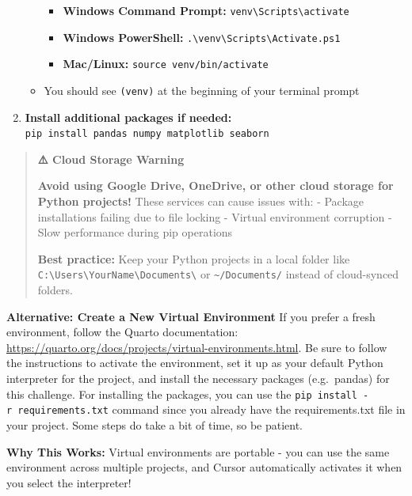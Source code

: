 \documentclass[
  letterpaper,
  DIV=11,
  numbers=noendperiod]{scrartcl}
\providecommand{\tightlist}{%
  \setlength{\itemsep}{0pt}\setlength{\parskip}{0pt}}
\begin{document}
\begin{tcolorbox}
\begin{enumerate}
\begin{itemize}
    \begin{itemize}
    \tightlist
    \item
      \textbf{Windows Command Prompt:}
      \texttt{venv\textbackslash{}Scripts\textbackslash{}activate}
    \item
      \textbf{Windows PowerShell:}
      \texttt{.\textbackslash{}venv\textbackslash{}Scripts\textbackslash{}Activate.ps1}
    \item
      \textbf{Mac/Linux:} \texttt{source\ venv/bin/activate}
    \end{itemize}
  \item
    You should see \texttt{(venv)} at the beginning of your terminal
    prompt
  \end{itemize}
\item
  \textbf{Install additional packages if needed:}
  \texttt{pip\ install\ pandas\ numpy\ matplotlib\ seaborn}
\end{enumerate}

\begin{quote}
\textbf{⚠️ Cloud Storage Warning}

\textbf{Avoid using Google Drive, OneDrive, or other cloud storage for
Python projects!} These services can cause issues with: - Package
installations failing due to file locking - Virtual environment
corruption - Slow performance during pip operations

\textbf{Best practice:} Keep your Python projects in a local folder like
\texttt{C:\textbackslash{}Users\textbackslash{}YourName\textbackslash{}Documents\textbackslash{}}
or \texttt{\textasciitilde{}/Documents/} instead of cloud-synced
folders.
\end{quote}

\textbf{Alternative: Create a New Virtual Environment} If you prefer a
fresh environment, follow the Quarto documentation:
\url{https://quarto.org/docs/projects/virtual-environments.html}. Be
sure to follow the instructions to activate the environment, set it up
as your default Python interpreter for the project, and install the
necessary packages (e.g.~pandas) for this challenge. For installing the
packages, you can use the \texttt{pip\ install\ -r\ requirements.txt}
command since you already have the requirements.txt file in your
project. Some steps do take a bit of time, so be patient.

\textbf{Why This Works:} Virtual environments are portable - you can use
the same environment across multiple projects, and Cursor automatically
activates it when you select the interpreter!

\end{tcolorbox}
\end{document}
